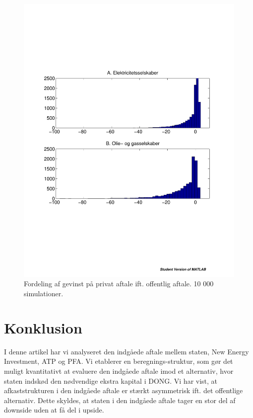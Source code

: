 \documentclass{article}
\begin{document}
\begin{figure}
\includegraphics[scale=0.8]{../matlab/figs/sim_return.pdf}
\caption{Fordeling af gevinst på privat aftale ift. offentlig aftale. 10 000 simulationer. }
\label{fig:sim}
\end{figure}

\FloatBarrier

\section{Konklusion}

I denne artikel har vi analyseret den indgåede aftale mellem staten, New Energy Investment, ATP og PFA. Vi etablerer en beregnings-struktur, som gør det muligt kvantitativt at evaluere den indgåede aftale imod et alternativ, hvor staten indskød den nødvendige ekstra kapital i DONG. Vi har vist, at afkaststrukturen i den indgåede aftale er stærkt asymmetrisk ift. det offentlige alternativ. Dette skyldes, at staten i den indgåede aftale tager en stor del af downside uden at få del i upside. 
\end{document}
